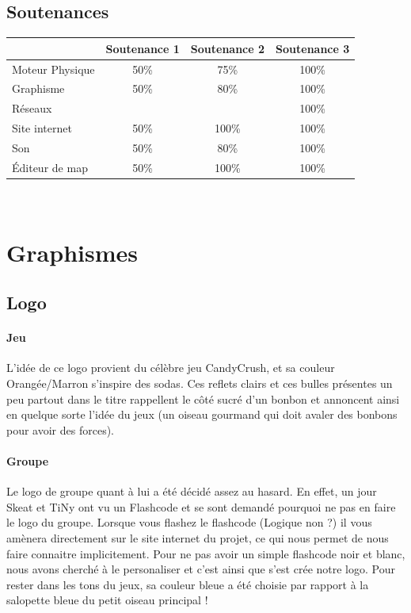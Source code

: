 \documentclass [11pt]{report}
\begin{document}
		\subsection{Soutenances}
			\begin{tabular}{| l | * {3}{c|}}
				\hline
		 		& Soutenance 1 & Soutenance 2 & Soutenance 3 \\
				\hline
				Moteur Physique & 50\% & 75\% & 100\% \\
				\hline
				 Graphisme & 50\% & 80\% & 100\% \\
				\hline
				Réseaux & & & 100\% \\
				\hline
				Site internet & 50\% & 100\%  & 100\%  \\
	          			 \hline
				Son & 50\% & 80\% & 100\% \\
				\hline
				\'Editeur de map & 50\% & 100\% & 100\% \\
				\hline
			\end{tabular}\\\vspace{4mm}


	\section{Graphismes}
		\subsection {Logo}
			\paragraph{Jeu}
			L'idée de ce logo provient du célèbre jeu CandyCrush, et sa couleur Orangée/Marron s'inspire des sodas. Ces reflets clairs et ces bulles présentes un peu partout dans le titre rappellent le côté sucré d'un bonbon et annoncent ainsi en quelque sorte l'idée du jeux (un oiseau gourmand qui doit avaler des bonbons pour avoir des forces). 

			\paragraph{Groupe}
			Le logo de groupe quant à lui a été décidé assez au hasard. En effet, un jour Skeat et TiNy ont vu un Flashcode et se sont demandé pourquoi ne pas en faire le logo du groupe. Lorsque vous flashez le flashcode (Logique non ?) il vous amènera directement sur le site internet du projet, ce qui nous permet de nous faire connaitre implicitement. Pour ne pas avoir un simple flashcode noir et blanc, nous avons cherché à le personaliser et c'est ainsi que s'est crée notre logo. Pour rester dans les tons du jeux, sa couleur bleue a été choisie par rapport à la salopette bleue du petit oiseau principal !\\\vspace{5mm}
\end{document}
